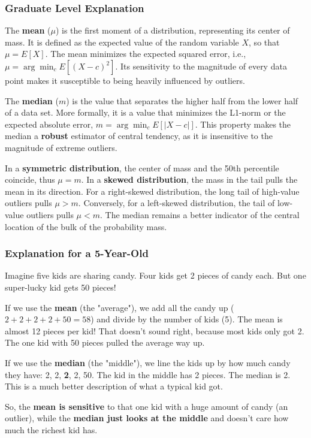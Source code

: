 \documentclass{article}
\begin{document}
\subsubsection*{\normalfont Graduate Level Explanation}
\parbox{\textwidth}{
The \textbf{mean} ($\mu$) is the first moment of a distribution, representing its center of mass. It is defined as the expected value of the random variable $X$, so that $\mu = E[X]$. The mean minimizes the expected squared error, i.e., $\mu = \arg\min_c E[(X-c)^2]$. Its sensitivity to the magnitude of every data point makes it susceptible to being heavily influenced by outliers.

\vspace{0.5em}

The \textbf{median} ($m$) is the value that separates the higher half from the lower half of a data set. More formally, it is a value that minimizes the L1-norm or the expected absolute error, $m = \arg\min_c E[|X-c|]$. This property makes the median a \textbf{robust} estimator of central tendency, as it is insensitive to the magnitude of extreme outliers.

\vspace{0.5em}

In a \textbf{symmetric distribution}, the center of mass and the 50th percentile coincide, thus $\mu = m$. In a \textbf{skewed distribution}, the mass in the tail pulls the mean in its direction. For a right-skewed distribution, the long tail of high-value outliers pulls $\mu > m$. Conversely, for a left-skewed distribution, the tail of low-value outliers pulls $\mu < m$. The median remains a better indicator of the central location of the bulk of the probability mass.
}

\vspace{2em}

\subsubsection*{\normalfont Explanation for a 5-Year-Old}
\parbox{\textwidth}{
Imagine five kids are sharing candy. Four kids get 2 pieces of candy each. But one super-lucky kid gets 50 pieces!

\vspace{0.5em}

If we use the \textbf{mean} (the "average"), we add all the candy up ($2+2+2+2+50 = 58$) and divide by the number of kids (5). The mean is almost 12 pieces per kid! That doesn't sound right, because most kids only got 2. The one kid with 50 pieces pulled the average way up.

\vspace{0.5em}

If we use the \textbf{median} (the "middle"), we line the kids up by how much candy they have: 2, 2, \textbf{2}, 2, 50. The kid in the middle has 2 pieces. The median is 2. This is a much better description of what a typical kid got.

\vspace{0.5em}

So, the \textbf{mean is sensitive} to that one kid with a huge amount of candy (an outlier), while the \textbf{median just looks at the middle} and doesn't care how much the richest kid has.
}
\end{document}
